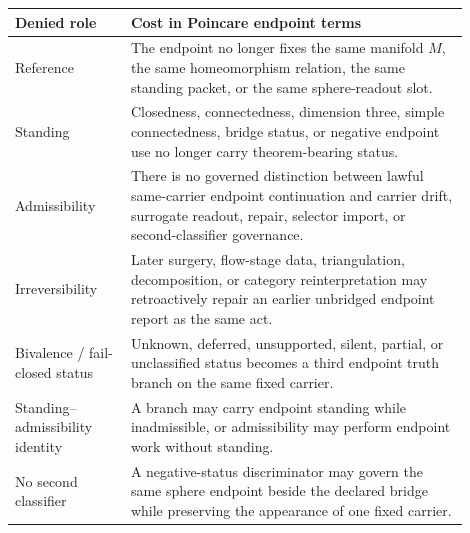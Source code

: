 \documentclass[11pt]{article}
\begin{document}
\begin{longtable}{L{0.23\linewidth}L{0.67\linewidth}}
\toprule
\textbf{Denied role} & \textbf{Cost in Poincare endpoint terms}\\
\midrule
Reference & The endpoint no longer fixes the same manifold \(M\), the same homeomorphism relation, the same standing packet, or the same sphere-readout slot.\\
Standing & Closedness, connectedness, dimension three, simple connectedness, bridge status, or negative endpoint use no longer carry theorem-bearing status.\\
Admissibility & There is no governed distinction between lawful same-carrier endpoint continuation and carrier drift, surrogate readout, repair, selector import, or second-classifier governance.\\
Irreversibility & Later surgery, flow-stage data, triangulation, decomposition, or category reinterpretation may retroactively repair an earlier unbridged endpoint report as the same act.\\
Bivalence / fail-closed status & Unknown, deferred, unsupported, silent, partial, or unclassified status becomes a third endpoint truth branch on the same fixed carrier.\\
Standing--admissibility identity & A branch may carry endpoint standing while inadmissible, or admissibility may perform endpoint work without standing.\\
No second classifier & A negative-status discriminator may govern the same sphere endpoint beside the declared bridge while preserving the appearance of one fixed carrier.\\
\bottomrule
\end{longtable}
\end{document}
